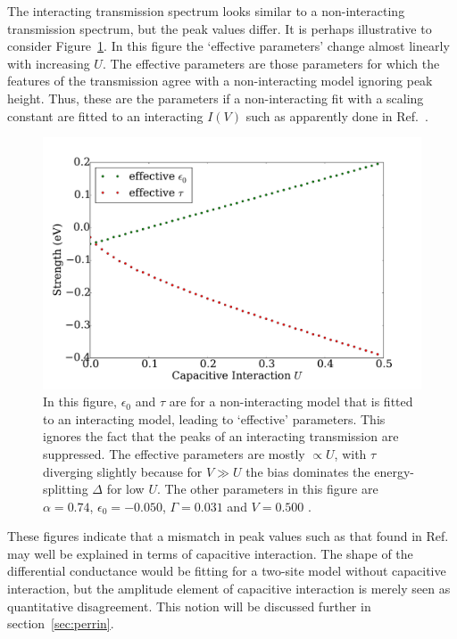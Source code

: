 The interacting transmission spectrum looks similar to a non-interacting transmission spectrum, but the peak values differ. It is perhaps illustrative to consider Figure~\ref{fig:perrin_effective}. In this figure the `effective parameters' change almost linearly with increasing $U$. The effective parameters are those parameters for which the features of the transmission agree with a non-interacting model ignoring peak height. Thus, these are the parameters if a non-interacting fit with a scaling constant are fitted to an interacting $I(V)$ such as apparently done in Ref.~\cite{perrinnano}.
\begin{figure}[htb]
    \centering
    \includegraphics[height=.35\textheight]{pdf/trustme.pdf}
    \caption{In this figure, $\epsilon_0$ and $\tau$ are for a non-interacting model that is fitted to an interacting model, leading to `effective' parameters. This ignores the fact that the peaks of an interacting transmission are suppressed. The effective parameters are mostly $\propto U$, with $\tau$ diverging slightly because for $V\gg U$ the bias dominates the energy-splitting $\Delta$ for low $U$. The other parameters in this figure are $\alpha=0.74$, $\epsilon_0 = -0.050$, $\Gamma = 0.031$ and $V=0.500$ .}
    \label{fig:perrin_effective}
\end{figure}


These figures indicate that a mismatch in peak values such as that found in Ref.~\cite{perrinnano} may well be explained in terms of capacitive interaction. The shape of the differential conductance would be fitting for a two-site model without capacitive interaction, but the amplitude element of capacitive interaction is merely seen as quantitative disagreement. This notion will be discussed further in section~\ref{sec:perrin}. 

